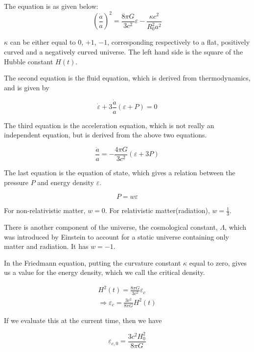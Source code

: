 \documentclass[a4,10pt,oneside]{report}
\begin{document}
	The equation is as given below:
	\begin{equation}
	\left(\frac{\dot{a}}{a}\right)^2=\frac{8\pi G}{3c^2}\varepsilon-\frac{\kappa c^2}{R_0^2a^2}
	\end{equation}
	
	$\kappa$ can be either equal to $0$, $+1$, $-1$, corresponding respectively to a flat, positively curved and a negatively curved universe.
	The left hand side is the square of the Hubble constant $H(t)$.
	
	The second equation is the fluid equation, which is derived from thermodynamics, and is given by
	
	\begin{equation}
		\dot{\varepsilon}+3\frac{\dot{a}}{a}(\varepsilon+P)=0
	\end{equation}
	
	The third equation is the acceleration equation, which is not really an independent equation, but is derived from the above two equations.
	
	\begin{equation}
		\frac{\ddot{a}}{a}=-\frac{4\pi G}{3c^2}(\varepsilon+3P)
	\end{equation}
	
	The last equation is the equation of state, which gives a relation between the pressure $P$ and energy density $\varepsilon$.
	
	\begin{equation}
		P=w\varepsilon
	\end{equation}
	
	For non-relativistic matter, $w=0$. For relativistic matter(radiation), $w=\frac{1}{3}$.
	
	There is another component of the universe, the cosmological constant, $\Lambda$, which was introduced by Einstein to account for a static universe containing only matter and radiation. It has $w=-1$.
	
	In the Friedmann equation, putting the curvature constant $\kappa$ equal to zero, gives us a value for the energy density, which we call the critical density.
	
	\begin{eqnarray}
	H^2(t)=\frac{8\pi G}{3c^2}\varepsilon_c \\
	\Rightarrow \varepsilon_c=\frac{3c^2}{8\pi G}H^2(t)
	\end{eqnarray}
	
	If we evaluate this at the current time, then we have
	
	\begin{equation}
		\varepsilon_{c,0}=\frac{3c^2H_0^2}{8\pi G}
	\end{equation}
    
\end{document}
